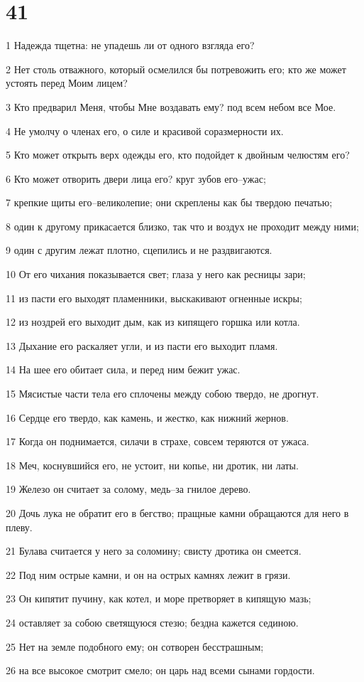 \chapter{41}

\par 1 Надежда тщетна: не упадешь ли от одного взгляда его?
\par 2 Нет столь отважного, который осмелился бы потревожить его; кто же может устоять перед Моим лицем?
\par 3 Кто предварил Меня, чтобы Мне воздавать ему? под всем небом все Мое.
\par 4 Не умолчу о членах его, о силе и красивой соразмерности их.
\par 5 Кто может открыть верх одежды его, кто подойдет к двойным челюстям его?
\par 6 Кто может отворить двери лица его? круг зубов его--ужас;
\par 7 крепкие щиты его--великолепие; они скреплены как бы твердою печатью;
\par 8 один к другому прикасается близко, так что и воздух не проходит между ними;
\par 9 один с другим лежат плотно, сцепились и не раздвигаются.
\par 10 От его чихания показывается свет; глаза у него как ресницы зари;
\par 11 из пасти его выходят пламенники, выскакивают огненные искры;
\par 12 из ноздрей его выходит дым, как из кипящего горшка или котла.
\par 13 Дыхание его раскаляет угли, и из пасти его выходит пламя.
\par 14 На шее его обитает сила, и перед ним бежит ужас.
\par 15 Мясистые части тела его сплочены между собою твердо, не дрогнут.
\par 16 Сердце его твердо, как камень, и жестко, как нижний жернов.
\par 17 Когда он поднимается, силачи в страхе, совсем теряются от ужаса.
\par 18 Меч, коснувшийся его, не устоит, ни копье, ни дротик, ни латы.
\par 19 Железо он считает за солому, медь--за гнилое дерево.
\par 20 Дочь лука не обратит его в бегство; пращные камни обращаются для него в плеву.
\par 21 Булава считается у него за соломину; свисту дротика он смеется.
\par 22 Под ним острые камни, и он на острых камнях лежит в грязи.
\par 23 Он кипятит пучину, как котел, и море претворяет в кипящую мазь;
\par 24 оставляет за собою светящуюся стезю; бездна кажется сединою.
\par 25 Нет на земле подобного ему; он сотворен бесстрашным;
\par 26 на все высокое смотрит смело; он царь над всеми сынами гордости.

